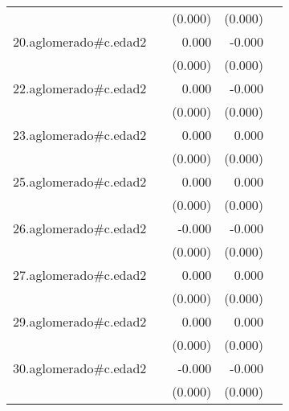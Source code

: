 {\begin{longtable}{l*{4}{D{.}{.}{-1}}}
            &                     &     (0.000)         &     (0.000)         &                     \\
\addlinespace
20.aglomerado#c.edad2&                     &       0.000         &      -0.000\sym{*}  &                     \\
            &                     &     (0.000)         &     (0.000)         &                     \\
\addlinespace
22.aglomerado#c.edad2&                     &       0.000         &      -0.000\sym{*}  &                     \\
            &                     &     (0.000)         &     (0.000)         &                     \\
\addlinespace
23.aglomerado#c.edad2&                     &       0.000\sym{**} &       0.000         &                     \\
            &                     &     (0.000)         &     (0.000)         &                     \\
\addlinespace
25.aglomerado#c.edad2&                     &       0.000\sym{*}  &       0.000         &                     \\
            &                     &     (0.000)         &     (0.000)         &                     \\
\addlinespace
26.aglomerado#c.edad2&                     &      -0.000         &      -0.000\sym{**} &                     \\
            &                     &     (0.000)         &     (0.000)         &                     \\
\addlinespace
27.aglomerado#c.edad2&                     &       0.000\sym{**} &       0.000         &                     \\
            &                     &     (0.000)         &     (0.000)         &                     \\
\addlinespace
29.aglomerado#c.edad2&                     &       0.000\sym{*}  &       0.000         &                     \\
            &                     &     (0.000)         &     (0.000)         &                     \\
\addlinespace
30.aglomerado#c.edad2&                     &      -0.000         &      -0.000\sym{***}&                     \\
            &                     &     (0.000)         &     (0.000)         &                     \\

\end{longtable}}
